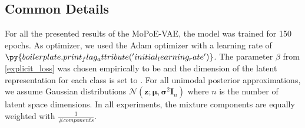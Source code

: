 \subsection{Common Details}
For all the presented results of the MoPoE-VAE, the model was trained for 150 epochs.
As optimizer, we used the Adam optimizer \cite{adam} with a learning rate of $\py{boilerplate.print_flag_attribute('initial_learning_rate')}$.
The parameter $\beta$ from \cref{explicit_loss} was chosen empirically to be  and the dimension of the latent representation for each class is set to .
For all unimodal posterior approximations, we assume Gaussian distributions $\mathcal{N}(\textbf{z}; \bm{\mu}, \bm{\sigma}^2\textbf{I}_n)$ where $n$ is the number of latent space dimensions.
In all experiments, the mixture components are equally weighted with $\frac{1}{\#components}$.

